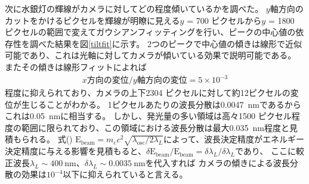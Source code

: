 \documentclass[a4paper,11pt,uplatex]{jsbook}
\begin{document}
次に水銀灯の輝線がカメラに対してどの程度傾いているかを調べた。
$y$軸方向のカットをかけるピクセルを輝線が明瞭に見える$y$ = 700 ピクセルから$y$ = 1800 ピクセルの範囲で変えてガウシアンフィッティングを行い、ピークの中心値の依存性を調べた結果を図\ref{tiltfit}に示す。
2つのピークで中心値の傾きは線形で近似可能であり、これは光軸に対してカメラが傾いている効果で説明可能である。
またその傾きは線形フィットによれば
\begin{eqnarray}
  x方向の変位 / y軸方向の変位 = 5 \times 10^{-3}
\end{eqnarray}
程度に抑えられており、カメラの上下2304 ピクセルに対して約12ピクセルの変位が生じることがわかる。
1ピクセルあたりの波長分散は0.0047~nmであるからこれは0.05~nmに相当する。
しかし、発光量の多い領域は高々1500 ピクセル程度の範囲に限られており、この領域における波長分散は最大0.035~nm程度と見積もられる。
式(\label{zero order energy formula}) $\text{E}_\text{beam} =m_e c^2  \sqrt{\lambda_{\text{osc}}/2\lambda_L} $によって、波長決定精度がエネルギー決定精度に与える影響を見積もると、$\delta \text{E}_\text{beam}/\text{E}_\text{beam} = \delta \lambda_L/\delta \lambda_L$であり、
ここに較正波長$\lambda_L \sim 400~\text{nm}$、$\delta \lambda_L \sim 0.0035~\text{nm}$を代入すれば
カメラの傾きによる波長分散の効果は$10^{-4}$以下に抑えられていると言える。
\end{document}
